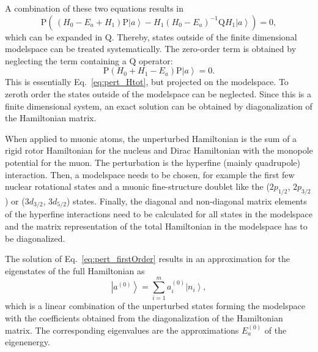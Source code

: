 A combination of these two equations results in
\begin{equation}
\text{P}\left( \,
(H_0-E_a+H_1)\text{P}\left|a\right>
- H_1(H_0-E_a)^{-1}\text{Q}H_1\left|a\right>
\right) = 0,
\label{eq:pert_projectionEq}
\end{equation}
which can be expanded in $\text{Q}$. Thereby, states outside of the finite dimensional modelspace can be treated systematically. The zero-order term is obtained by neglecting the term containing a $\text{Q}$ operator:
\begin{equation}
\label{eq:pert_firstOrder}
\text{P}\left(H_0+H_1-E_a\right) \text{P}\left|a\right> = 0.
\end{equation}
This is essentially Eq.~\eqref{eq:pert_Htot}, but projected on the modelspace. To zeroth order the states outside of the modelspace can be neglected. Since this is a finite dimensional system, an exact solution can be obtained by diagonalization of the Hamiltonian matrix.

When applied to muonic atoms, the unperturbed Hamiltonian is the sum of  a rigid rotor Hamiltonian for the nucleus and Dirac Hamiltonian with the monopole potential for the muon. The perturbation is the hyperfine (mainly quadrupole) interaction. Then, a modelspace needs to be chosen, for example the first few nuclear rotational states and a muonic fine-structure doublet like the ($2p_{1/2}$, $2p_{3/2}$) or ($3d_{3/2}$, $3d_{5/2}$) states. Finally, the diagonal and non-diagonal matrix elements of the hyperfine interactions need to be calculated for all states in the modelspace and the matrix representation of the total Hamiltonian in the modelspace has to be diagonalized.

The solution of Eq.~\eqref{eq:pert_firstOrder} results in an approximation for the eigenstates of the full Hamiltonian as
\begin{equation}
\label{eq:pert_firstOrderState}
\left|a^{(0)}\right> = \sum_{i=1}^m a_i^{(0)}\left|n_i\right>,
\end{equation}
which is a linear combination of the unperturbed states forming the modelspace with the coefficients obtained from the diagonalization of the Hamiltonian matrix. The corresponding eigenvalues are the approximations $E_a^{(0)}$ of the eigenenergy.

